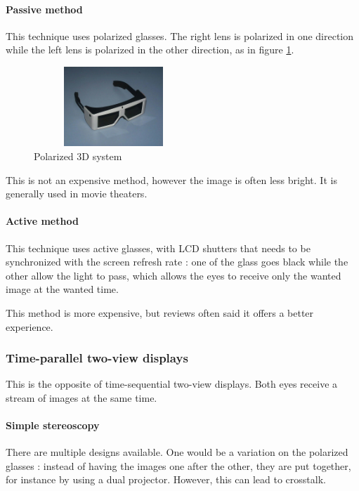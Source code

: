 \paragraph{Passive method}
This technique uses polarized glasses. The right lens is polarized in one direction while the left lens is polarized in the other direction, as in figure \ref{fig:polarized3D}. 

\begin{figure}[h!]
\begin{center}
\begin{minipage}{1\linewidth}
\centering\includegraphics[width=6cm,height=30mm]{image/2.jpg}
\caption{Polarized 3D system}
\label{fig:polarized3D}
\end{minipage}
\end{center}
\end{figure}

This is not an expensive method, however the image is often less bright. It is generally used in movie theaters.

\paragraph{Active method}
This technique uses active glasses, with LCD shutters that needs to be synchronized with the screen refresh rate : one of the glass goes black while the other allow the light to pass, which allows the eyes to receive only the wanted image at the wanted time.

This method is more expensive, but reviews often said it offers a better experience.

\subsubsection{Time-parallel two-view displays}
This is the opposite of time-sequential two-view displays. Both eyes receive a stream of images at the same time.

\paragraph{Simple stereoscopy}
\label{par:polarized}
There are multiple designs available. One would be a variation on the polarized glasses : instead of having the images one after the other, they are put together, for instance by using a dual projector. However, this can lead to crosstalk.

